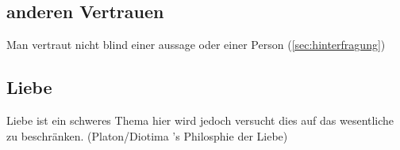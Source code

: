             \subsection{anderen Vertrauen}  
                Man vertraut nicht blind einer aussage oder einer Person (\ref{sec:hinterfragung})
        \subsection{Liebe}
            Liebe ist ein schweres Thema hier wird jedoch versucht dies auf das wesentliche zu beschränken. 
            {\color{red} (Platon/Diotima 's Philosphie der Liebe)} 

    
